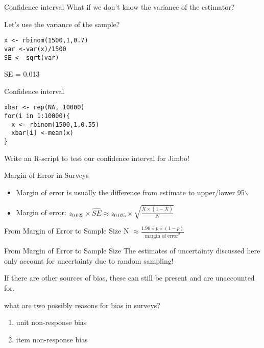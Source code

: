 \documentclass[presentation]{beamer}
\begin{document}
\begin{frame}[fragile,label={sec:org6f5c86f}]{Confidence interval}
 What if we don't know the variance of the estimator?

Let's use the variance of the sample?

\begin{verbatim}
x <- rbinom(1500,1,0.7)
var <-var(x)/1500
SE <- sqrt(var)
\end{verbatim}

SE = 0.013
\end{frame}


\begin{frame}[fragile,label={sec:org1149f61}]{Confidence interval}
 \begin{verbatim}
xbar <- rep(NA, 10000)
for(i in 1:10000){
  x <- rbinom(1500,1,0.55)
  xbar[i] <-mean(x)
}
\end{verbatim}

Write an R-script to test our confidence interval for Jimbo!
\end{frame}


\begin{frame}[label={sec:orgcc7d6be}]{Margin of Error in Surveys}
\begin{itemize}
\item Margin of error is usually the difference from estimate to upper/lower 95$\backslash$%

\item Margin of error: \(z_{0.025} \times \hat{SE} \approx  z_{0.025} \times \sqrt{\frac{\overline{X} \times (1-\overline{X})}{N}}\)
\end{itemize}
\end{frame}


\begin{frame}[label={sec:orgac89161}]{From Margin of Error to Sample Size}
N \(\approx \frac{1.96 \times p \times (1-p)}{\text{margin of error}^{2}}\)
\end{frame}


\begin{frame}[label={sec:orgb9206e4}]{From Margin of Error to Sample Size}
The estimates of uncertainty discussed here only account for uncertainty due to random sampling!

If there are other sources of bias, these can still be present and are unaccounted for.

\alert{what are two possibly reasons for bias in surveys?}

\pause

\begin{enumerate}
\item unit non-response bias
\item item non-response bias
\end{enumerate}
\end{frame}
\end{document}
